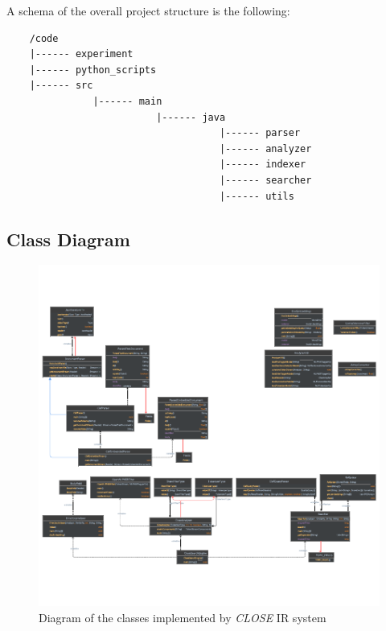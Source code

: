 \vspace{\baselineskip}
A schema of the overall project structure is the following:
\begin{lstlisting}
    /code
    |------ experiment
    |------ python_scripts
    |------ src
               |------ main
                          |------ java
                                     |------ parser
                                     |------ analyzer
                                     |------ indexer
                                     |------ searcher
                                     |------ utils
\end{lstlisting}

\newpage
\subsection{Class Diagram}
\begin{figure}[!h]
    \centering
    \includegraphics[width=\textwidth]{figure/Classes_diagram_white.pdf}
    \caption{Diagram of the classes implemented by \textit{CLOSE} \ac{IR} system}
    \label{fig:Classes_diagram_white}
\end{figure}
\clearpage


